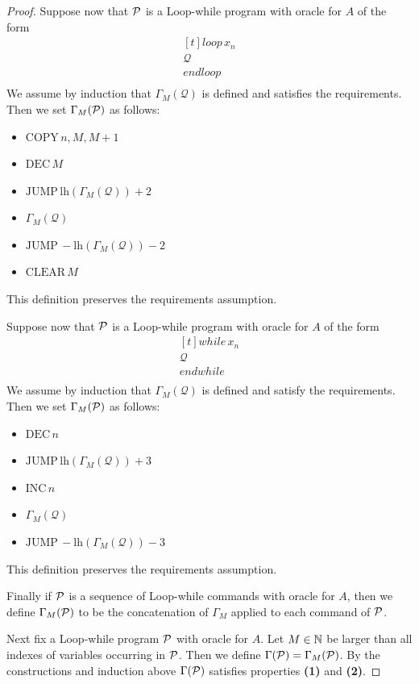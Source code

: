 \documentclass[10pt]{amsart}
\begin{document}
\begin{proof}
	Suppose now that ${\mathcal P}$ is a Loop-while program with oracle for $A$ of the form
	$$\begin{aligned}[t]
			\mathit{loop}\,x_n \\
			\mathcal{Q}        \\
			\mathit{endloop}   \\
		\end{aligned}$$
	We assume by induction that $\Gamma_M(\mathcal{Q})$ is defined and satisfies the requirements. Then we set $\Gamma_M({\mathcal P})$ as follows:
	\begin{itemize}
		\item[] $\mathrm{COPY\,}n,M,M+1$
		\item[] $\mathrm{DEC}\,M$
		\item[] $\mathrm{JUMP}\,\mathrm{lh}\left(\Gamma_M(\mathcal{Q})\right) + 2$
		\item[] $\Gamma_M(\mathcal{Q})$
		\item[] $\mathrm{JUMP}\,-\mathrm{lh}\left(\Gamma_M(\mathcal{Q})\right) - 2$
		\item[] $\mathrm{CLEAR\,}M$
	\end{itemize}
	This definition preserves the requirements assumption.

	Suppose now that ${\mathcal P}$ is a Loop-while program with oracle for $A$ of the form
	$$\begin{aligned}[t]
			\mathit{while}\,x_n \\
			\mathcal{Q}         \\
			\mathit{endwhile}   \\
		\end{aligned}$$
	We assume by induction that $\Gamma_M(\mathcal{Q})$ is defined and satisfy the requirements. Then we set $\Gamma_M({\mathcal P})$ as follows:
	\begin{itemize}
		\item[] $\mathrm{DEC}\,n$
		\item[] $\mathrm{JUMP}\,\mathrm{lh}\left(\Gamma_M(\mathcal{Q})\right) + 3$
		\item[] $\mathrm{INC}\,n$
		\item[] $\Gamma_M(\mathcal{Q})$
		\item[] $\mathrm{JUMP}\,-\mathrm{lh}\left(\Gamma_M(\mathcal{Q})\right) - 3$
	\end{itemize}
	This definition preserves the requirements assumption.

	Finally if ${\mathcal P}$ is a sequence of Loop-while commands with oracle for $A$, then we define $\Gamma_M({\mathcal P})$ to be the concatenation of $\Gamma_M$ applied to each command of ${\mathcal P}$.

	Next fix a Loop-while program ${\mathcal P}$ with oracle for $A$. Let $M \in {\mathbb N}$ be larger than all indexes of variables occurring in ${\mathcal P}$. Then we define $\Gamma({\mathcal P}) = \Gamma_M({\mathcal P})$. By the constructions and induction above $\Gamma({\mathcal P})$ satisfies properties \textbf{(1)} and \textbf{(2)}.
\end{proof}
\end{document}
